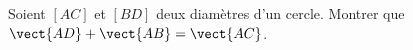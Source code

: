 
\begin{exercice}\label{exosmath-0073}

    Soient \( [AC]\) et \( [BD]\) deux diamètres d'un cercle. Montrer que \( \vect{ AD }+\vect{ AB }=\vect{ AC }\).

\end{exercice}

